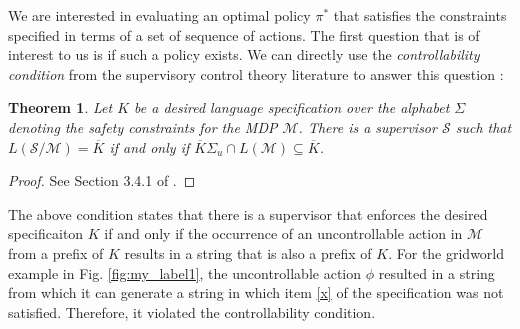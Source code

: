 \documentclass[letterpaper, 10 pt, conference]{ieeeconf}
\newtheorem{theorem}{Theorem}
\begin{document}

We are interested in evaluating an optimal policy $\pi^*$ that satisfies the constraints specified in terms of a set of sequence of actions. The first question that is of interest to us is if such a policy exists. We can directly use the {\it controllability condition} from the supervisory control theory literature to answer this question \cite{ramadge1989control, cassandras2009introduction}:
\begin{theorem}\label{ct}
Let $K$ be a desired language specification over the alphabet $\Sigma$ denoting the safety constraints for the MDP $\mathcal{M}$. There is a supervisor $\mathcal{S}$ such that $L(\mathcal{S}/\mathcal{M}) = \overline{K}$ if and only if $\overline{K}\Sigma_u \cap L(\mathcal{M}) \subseteq \overline{K}$.
\end{theorem}
\begin{proof}
See Section 3.4.1 of \cite{cassandras2009introduction}.
\end{proof}
The above condition states that there is a supervisor that enforces the desired specificaiton $K$ if and only if the occurrence of an uncontrollable action in $\mathcal{M}$ from a prefix of $K$ results in a string that is also a prefix of $K$. For the gridworld example in Fig. \ref{fig:my_label1}, the uncontrollable action $\phi$ resulted in a string from which it can generate a string in which item \ref{x} of the specification was not satisfied. Therefore, it violated the controllability condition.
\end{document}
